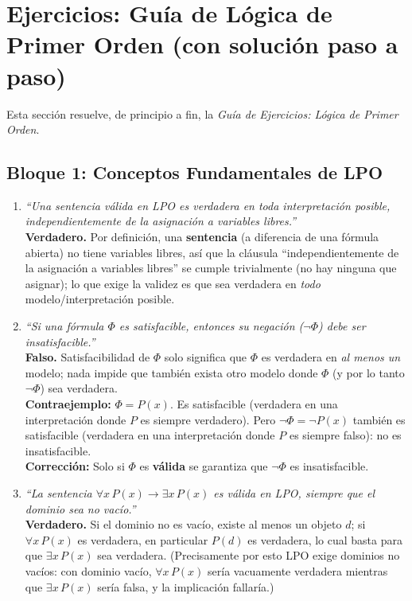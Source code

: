 \section{Ejercicios: Guía de Lógica de Primer Orden (con solución paso a paso)}

Esta sección resuelve, de principio a fin, la \textit{Guía de Ejercicios: Lógica de Primer Orden}.

\subsection{Bloque 1: Conceptos Fundamentales de LPO}

\begin{enumerate}
    \item \textit{``Una sentencia válida en LPO es verdadera en toda interpretación posible,
    independientemente de la asignación a variables libres.''}\\
    \textbf{Verdadero.} Por definición, una \textbf{sentencia} (a diferencia de una fórmula abierta)
    no tiene variables libres, así que la cláusula ``independientemente de la asignación a variables
    libres'' se cumple trivialmente (no hay ninguna que asignar); lo que exige la validez es que sea
    verdadera en \emph{todo} modelo/interpretación posible.

    \item \textit{``Si una fórmula $\Phi$ es satisfacible, entonces su negación ($\neg\Phi$) debe
    ser insatisfacible.''}\\
    \textbf{Falso.} Satisfacibilidad de $\Phi$ solo significa que $\Phi$ es verdadera en \emph{al
    menos un} modelo; nada impide que también exista otro modelo donde $\Phi$ (y por lo tanto
    $\neg\Phi$) sea verdadera.\\
    \textbf{Contraejemplo:} $\Phi = P(x)$. Es satisfacible (verdadera en una interpretación donde
    $P$ es siempre verdadero). Pero $\neg\Phi = \neg P(x)$ también es satisfacible (verdadera en una
    interpretación donde $P$ es siempre falso): no es insatisfacible.\\
    \textbf{Corrección:} Solo si $\Phi$ es \textbf{válida} se garantiza que $\neg\Phi$ es
    insatisfacible.

    \item \textit{``La sentencia $\forall x\, P(x) \to \exists x\, P(x)$ es válida en LPO, siempre
    que el dominio sea no vacío.''}\\
    \textbf{Verdadero.} Si el dominio no es vacío, existe al menos un objeto $d$; si $\forall x\,
    P(x)$ es verdadera, en particular $P(d)$ es verdadera, lo cual basta para que $\exists x\, P(x)$
    sea verdadera. (Precisamente por esto LPO exige dominios no vacíos: con dominio vacío,
    $\forall x\, P(x)$ sería vacuamente verdadera mientras que $\exists x\, P(x)$ sería falsa, y la
    implicación fallaría.)


\end{enumerate}
